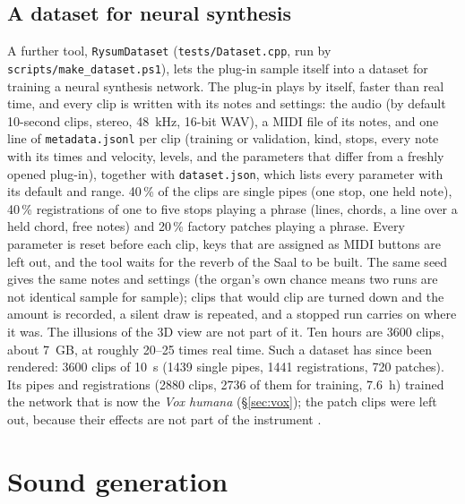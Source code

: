 \documentclass[11pt,a4paper,parskip=half,DIV=11,toc=bibliography]{scrartcl}
\newcommand{\ui}[1]{\emph{#1}}                 %
\newcommand{\fn}[1]{\mbox{\texttt{#1}}}
\begin{document}
\subsection{A dataset for neural synthesis}
\label{sec:dataset}
A further tool, \fn{RysumDataset} (\fn{tests/Dataset.cpp}, run by \fn{scripts/make\_dataset.ps1}), lets the plug-in sample itself into a dataset
for training a neural synthesis network. The plug-in plays by itself, faster than real time, and every clip is written with its notes and settings:
the audio (by default 10-second clips, stereo, \SI{48}{kHz}, 16-bit WAV), a MIDI file of its notes, and one line of \fn{metadata.jsonl} per clip
(training or validation, kind, stops, every note with its times and velocity, levels, and the parameters that differ from a freshly opened plug-in),
together with \fn{dataset.json}, which lists every parameter with its default and range. 40\,\% of the clips are single pipes (one stop, one held note),
40\,\% registrations of one to five stops playing a phrase (lines, chords, a line over a held chord, free notes) and 20\,\% factory patches playing a
phrase. Every parameter is reset before each clip, keys that are assigned as MIDI buttons are left out, and the tool waits for the reverb of the Saal
to be built. The same seed gives the same notes and settings (the organ's own chance means two runs are not identical sample for sample); clips
that would clip are turned down and the amount is recorded, a silent draw is repeated, and a stopped run carries on where it was. The illusions of the
3D view are not part of it. Ten hours are 3600 clips, about \SI{7}{GB}, at roughly 20--25 times real time.
Such a dataset has since been rendered: 3600 clips of \SI{10}{s} (1439 single pipes, 1441 registrations, 720 patches). Its pipes and registrations
(2880 clips, 2736 of them for training, \SI{7.6}{h}) trained the network that is now the \ui{Vox humana} (\S\ref{sec:vox}); the patch clips were left
out, because their effects are not part of the instrument \citep{neuralrysum2}.

\section{Sound generation}
\label{sec:voice}
\end{document}
